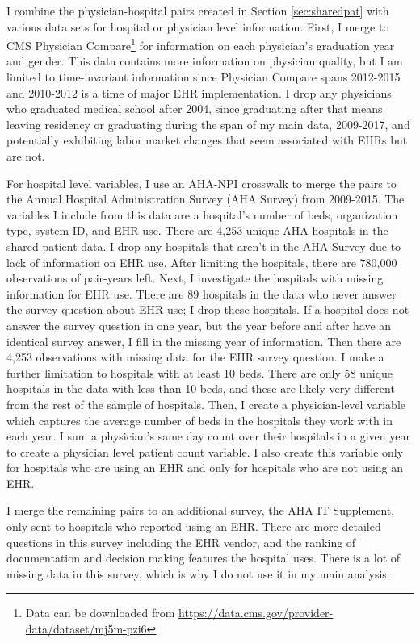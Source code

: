\documentclass[12pt]{article}
\begin{document}
I combine the physician-hospital pairs created in Section \ref{sec:sharedpat} with various data sets for hospital or physician level information. First, I merge to CMS Physician Compare\footnote{Data can be downloaded from \hyperlink{https://data.cms.gov/provider-data/dataset/mj5m-pzi6}{https://data.cms.gov/provider-data/dataset/mj5m-pzi6}} for information on each physician's graduation year and gender. This data contains more information on physician quality, but I am limited to time-invariant information since Physician Compare spans 2012-2015 and 2010-2012 is a time of major EHR implementation. I drop any physicians who graduated medical school after 2004, since graduating after that means leaving residency or graduating during the span of my main data, 2009-2017, and potentially exhibiting labor market changes that seem associated with EHRs but are not. 

For hospital level variables, I use an AHA-NPI crosswalk to merge the pairs to the Annual Hospital Administration Survey (AHA Survey) from 2009-2015. The variables I include from this data are a hospital's number of beds, organization type, system ID, and EHR use. There are 4,253 unique AHA hospitals in the shared patient data. I drop any hospitals that aren't in the AHA Survey due to lack of information on EHR use. After limiting the hospitals, there are 780,000 observations of pair-years left. Next, I investigate the hospitals with missing information for EHR use. There are 89 hospitals in the data who never answer the survey question about EHR use; I drop these hospitals. If a hospital does not answer the survey question in one year, but the year before and after have an identical survey answer, I fill in the missing year of information. Then there are 4,253 observations with missing data for the EHR survey question. I make a further limitation to hospitals with at least 10 beds. There are only 58 unique hospitals in the data with less than 10 beds, and these are likely very different from the rest of the sample of hospitals. Then, I create a physician-level variable which captures the average number of beds in the hospitals they work with in each year. I sum a physician's same day count over their hospitals in a given year to create a physician level patient count variable. I also create this variable only for hospitals who are using an EHR and only for hospitals who are not using an EHR.

I merge the remaining pairs to an additional survey, the AHA IT Supplement, only sent to hospitals who reported using an EHR. There are more detailed questions in this survey including the EHR vendor, and the ranking of documentation and decision making features the hospital uses. There is a lot of missing data in this survey, which is why I do not use it in my main analysis. 
\end{document}
